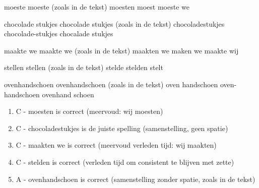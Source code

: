 \begin{opgave}
\begin{vragen}
%
{moeste}%
{moeste (zoals in de tekst)}%
{moesten}%
{moest}%
{moeste we}

%
{chocolade stukjes}%
{chocolade stukjes (zoals in de tekst)}%
{chocoladestukjes}%
{chocolade-stukjes}%
{chocalade stukjes}

%
{maakte we}%
{maakte we (zoals in de tekst)}%
{maakten we}%
{maken we}%
{maakte wij}

%
{stellen}%
{stellen (zoals in de tekst)}%
{stelde}%
{stelden}%
{stelt}

%
{ovenhandschoen}%
{ovenhandschoen (zoals in de tekst)}%
{oven handschoen}%
{oven-handschoen}%
{ovenhand schoen}

\end{vragen}

\end{opgave}

\begin{oplossing}
\begin{enumerate}
\item C - moesten is correct (meervoud: wij moesten)
\item C - chocoladestukjes is de juiste spelling (samenstelling, geen
spatie)
\item C - maakten we is correct (meervoud verleden tijd: wij maakten)
\item C - stelden is correct (verleden tijd om consistent te blijven met
zette)
\item A - ovenhandschoen is correct (samenstelling zonder spatie, zoals in
de tekst)
\end{enumerate}
\end{oplossing}
